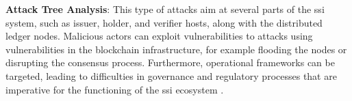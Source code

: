 \textbf{Attack Tree Analysis}: This type of attacks aim at several parts of the \gls{ssi} system, such as issuer, holder, and verifier hosts, along with the distributed ledger nodes. 
Malicious actors can exploit vulnerabilities to attacks using vulnerabilities in the blockchain infrastructure, for example flooding the nodes or disrupting the consensus 
process. Furthermore, operational frameworks can be targeted, leading to difficulties in governance and regulatory processes that are imperative for the functioning of the 
\gls{ssi} ecosystem \cite{9659929}.